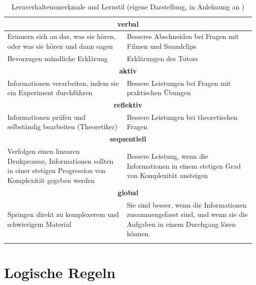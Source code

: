 \begin{longtable}{|m{7.5cm}|m{7.5cm}|}
  \multicolumn{2}{|c|}{\textbf{verbal}} \\ \hline \hline 
  Erinnern sich an das, was sie hören, oder was sie hören und dann sagen & Besseres Abschneiden bei Fragen mit Filmen und Soundclips \\ \hline
  Bevorzugen mündliche Erklärung  & Erklärungen des Tutors\\ \hline  \hline   
   

  \multicolumn{2}{|c|}{\textbf{aktiv}} \\ \hline \hline 
  Informationen verarbeiten, indem sie ein Experiment durchführen & Bessere Leistungen bei Fragen mit praktischen Übungen \\ \hline  \hline   
   

  \multicolumn{2}{|c|}{\textbf{reflektiv}} \\ \hline \hline 
  Informationen prüfen und selbständig bearbeiten (Theoretiker) & Bessere Leistungen bei theoretischen Fragen \\ \hline  \hline   
   

  \multicolumn{2}{|c|}{\textbf{sequentiell}} \\ \hline \hline 
  Verfolgen einen linearen Denkprozess, Informationen sollten in einer stetigen Progression von Komplexität gegeben werden &
  Bessere Leistung, wenn die Informationen in einem stetigen Grad von Komplexität ansteigen \\ \hline \hline   
   

  \multicolumn{2}{|c|}{\textbf{global}} \\ \hline \hline 
  Springen direkt zu komplexerem und schwierigem Material &
  Sie sind besser, wenn die Informationen zusammengefasst sind, und wenn sie die Aufgaben in einem Durchgang lösen können. \\ \hline
\caption[Lernverhaltensmerkmale und Lernstil]{Lernverhaltensmerkmale und Lernstil  (eigene Darstellung, in Anlehnung an \parencite[56]{Latham.2011}) } 
\label{tab:/Lernverhaltensmerkmale_Anhang} 
\end{longtable}
\endgroup

\section{Logische Regeln}\label{LogicRulesAnhang}

